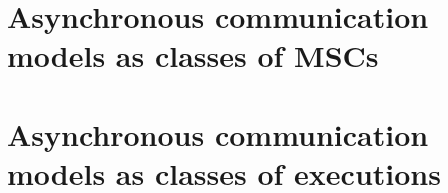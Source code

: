 \documentclass[a4paper,12pt,titlepage,oneside,openany]{book}
\begin{document}



% 




\chapter{Asynchronous communication models as classes of MSCs}\label{CH:MSC}



\chapter{Asynchronous communication models as classes of executions}\label{CH:IMPL}
\end{document}
